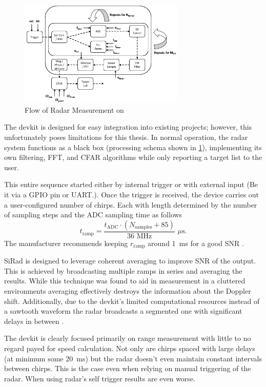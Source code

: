 \begin{figure}[h!]
  \centering
  \includegraphics[width=0.7\textwidth]{../img/sirad_flow.png}
  \caption[Flow of Radar Measurement on \sirad \cite{siradPRO}]{Flow of Radar Measurement on \sirad \cite{siradPRO}}
  \label{fig:siradFlow}
\end{figure}

The devkit is designed for easy integration into existing projects; however, this unfortunately poses limitations for this thesis.
In normal operation, the radar system functions as a black box (processing schema shown in \ref{fig:siradFlow}), implementing its own filtering, FFT, and CFAR algorithms while only reporting a target list to the user.

This entire sequence started either by internal trigger or with external input (Be it via a GPIO pin or UART.).
Once the trigger is received, the device carries out a user-configured number of chirps.
Each with length determined by the number of sampling steps and the ADC sampling time as follows
\begin{equation}
  t_\mathrm{ramp} = \frac{t_\mathrm{ADC} \cdot  (N_\mathrm{samples} + 85)}{36\,\, \mathrm{MHz}} \,\, \mu\mathrm{s}.
  \label{eq:sampling}
\end{equation}
The manufacturer recommends keeping $r_\mathrm{ramp}$ around 1~ms for a good SNR \cite{siradPRO}.

SiRad is designed to leverage coherent averaging to improve SNR of the output.
This is achieved by broadcasting multiple ramps in series and averaging the results.
While this technique was found to aid in measurement in a cluttered environments averaging effectively destroys the information about the Doppler shift.
Additionally, due to the devkit's limited computational resources instead of a sawtooth waveform the radar broadcasts a segmented one with significant delays in between \cite{siradPRO}.

The devkit is clearly focused primarily on range measurement with little to no regard payed for speed calculation.
Not only are chirps spaced with large delays (at minimum some 20~ms) but the radar doesn't even maintain constant intervals between chirps.
This is the case even when relying on manual triggering of the radar.
When using radar's self trigger results are even worse.


